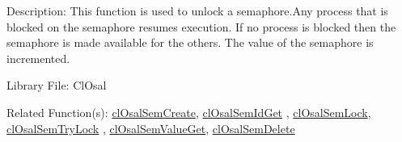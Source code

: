 \begin{Desc}
\item[Description:]This function is used to unlock a semaphore.Any process that is blocked on the semaphore resumes execution. If no process is blocked then the semaphore is made available for the others. The value of the semaphore is incremented.\end{Desc}
\begin{Desc}
\item[Library File:]Cl\-Osal\end{Desc}
\begin{Desc}
\item[Related Function(s):]\hyperlink{pageosal132}{cl\-Osal\-Sem\-Create}, \hyperlink{pageosal133}{cl\-Osal\-Sem\-Id\-Get} , 
\hyperlink{pageosal134}{cl\-Osal\-Sem\-Lock}, \hyperlink{pageosal135}{cl\-Osal\-Sem\-Try\-Lock} , 
\hyperlink{pageosal137}{cl\-Osal\-Sem\-Value\-Get}, \hyperlink{pageosal138}{cl\-Osal\-Sem\-Delete} \end{Desc}

\newpage
